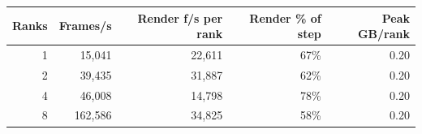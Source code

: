 \begin{tabular}{rrrrr}
\toprule
Ranks & Frames/s & Render f/s per rank & Render \% of step & Peak GB/rank \\
\midrule
1 & 15,041 & 22,611 & 67\% & 0.20 \\
2 & 39,435 & 31,887 & 62\% & 0.20 \\
4 & 46,008 & 14,798 & 78\% & 0.20 \\
8 & 162,586 & 34,825 & 58\% & 0.20 \\
\bottomrule
\end{tabular}
